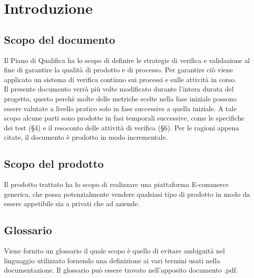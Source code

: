 \section{Introduzione}

\subsection{Scopo del documento}
Il Piano di Qualifica ha lo scopo di definire le strategie di verifica e validazione al fine di garantire la qualità di prodotto e di processo. Per garantire ciò viene applicato un sistema di verifica continuo sui processi e sulle attività in corso.\\
Il presente documento verrà più volte modificato durante l'intera durata del progetto, questo perchè molte delle metriche scelte nella fase iniziale possono essere valutate a livello pratico solo in fase successive a quella iniziale. A tale scopo alcune parti sono prodotte in fasi temporali successive, come le specifiche dei test (§4) e il resoconto delle attività di verifica (§6). Per le ragioni appena citate, il documento è prodotto in modo incrementale.

\subsection{Scopo del prodotto}
Il prodotto trattato ha lo scopo di realizzare una piattaforma E-commerce generica, che possa potenzialmente vendere qualsiasi tipo di prodotto in modo da essere appetibile sia a privati che ad aziende.

\subsection{Glossario}
Viene fornito un glossario il quale scopo è quello di evitare ambiguità nel linguaggio utilizzato fornendo una definizione ai vari termini usati nella documentazione. Il glossario può essere trovato nell'apposito documento \Glossario{}.pdf.

